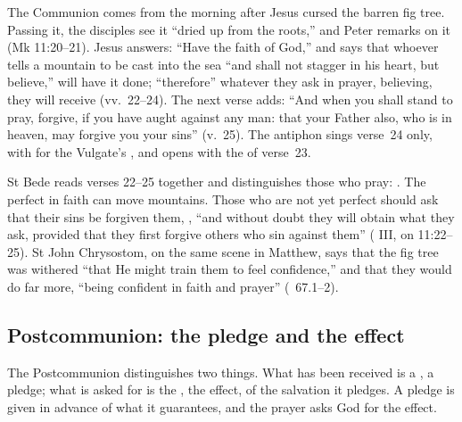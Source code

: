 The Communion comes from the morning after Jesus cursed the barren fig tree.
Passing it, the disciples see it ``dried up from the roots,'' and Peter
remarks on it (Mk 11:20--21). Jesus answers: ``Have the faith of God,'' and
says that whoever tells a mountain to be cast into the sea ``and shall not
stagger in his heart, but believe,'' will have it done; ``therefore'' whatever
they ask in prayer, believing, they will receive (vv.~22--24). The next verse
adds: ``And when you shall stand to pray, forgive, if you have aught against
any man: that your Father also, who is in heaven, may forgive you your sins''
(v.~25). The antiphon sings verse~24 only, with  for the
Vulgate's , and opens with the  of verse~23.

St Bede reads verses 22--25 together and distinguishes those who pray:
. The perfect in faith can move
mountains. Those who are not yet perfect should ask that their sins be
forgiven them, , ``and without doubt they will obtain
what they ask, provided that they first forgive others who sin against them''
( III, on 11:22--25). St John
Chrysostom, on the same scene in Matthew, says that the fig tree was withered
``that He might train them to feel confidence,'' and that they would do far
more, ``being confident in faith and prayer'' (\ 67.1--2).

\subsection{Postcommunion: the pledge and the effect}
\label{sec:element-postcommunion}

The Postcommunion distinguishes two things. What has been received
 is a , a pledge; what is asked for is
the , the effect, of the salvation it pledges. A pledge is
given in advance of what it guarantees, and the prayer asks God for the
effect.
